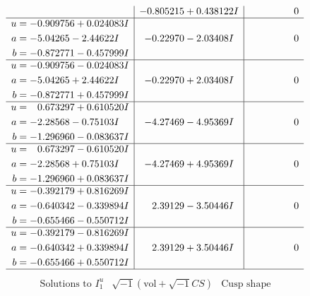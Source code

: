 \documentclass[1p]{elsarticle_modified}
\theoremstyle{definition}
\newcommand{\I}{\sqrt{-1}}
\begin{document}
$$\begin{array}{c|c|c}
 & -0.805215 + 0.438122 I & \phantom{-0.000000 } 0 \\ \hline\begin{aligned}
u &= -0.909756 + 0.024083 I \\
a &= -5.04265 - 2.44622 I \\
b &= -0.872771 - 0.457999 I\end{aligned}
 & -0.22970 - 2.03408 I & \phantom{-0.000000 } 0 \\ \hline\begin{aligned}
u &= -0.909756 - 0.024083 I \\
a &= -5.04265 + 2.44622 I \\
b &= -0.872771 + 0.457999 I\end{aligned}
 & -0.22970 + 2.03408 I & \phantom{-0.000000 } 0 \\ \hline\begin{aligned}
u &= \phantom{-}0.673297 + 0.610520 I \\
a &= -2.28568 - 0.75103 I \\
b &= -1.296960 - 0.083637 I\end{aligned}
 & -4.27469 - 4.95369 I & \phantom{-0.000000 } 0 \\ \hline\begin{aligned}
u &= \phantom{-}0.673297 - 0.610520 I \\
a &= -2.28568 + 0.75103 I \\
b &= -1.296960 + 0.083637 I\end{aligned}
 & -4.27469 + 4.95369 I & \phantom{-0.000000 } 0 \\ \hline\begin{aligned}
u &= -0.392179 + 0.816269 I \\
a &= -0.640342 - 0.339894 I \\
b &= -0.655466 - 0.550712 I\end{aligned}
 & \phantom{-}2.39129 - 3.50446 I & \phantom{-0.000000 } 0 \\ \hline\begin{aligned}
u &= -0.392179 - 0.816269 I \\
a &= -0.640342 + 0.339894 I \\
b &= -0.655466 + 0.550712 I\end{aligned}
 & \phantom{-}2.39129 + 3.50446 I & \phantom{-0.000000 } 0\\
 \hline 
 \end{array}$$\newpage$$\begin{array}{c|c|c}  
\text{Solutions to }I^u_{1}& \I (\text{vol} + \sqrt{-1}CS) & \text{Cusp shape}\\

\end{array}$$
\end{document}
